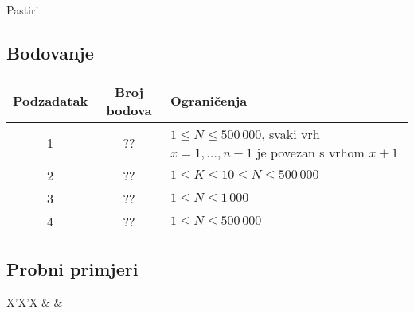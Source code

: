 \begin{statement}[
  problempoints=100,
  timelimit=1 sekunda,
  memorylimit=512 MiB,
]{Pastiri}
\subsection*{Bodovanje}
{\renewcommand{\arraystretch}{1.4}
  \setlength{\tabcolsep}{6pt}
  \begin{tabular}{ccl}
 Podzadatak & Broj bodova & Ograničenja \\ \midrule
  1 & ?? & $1 \le N \le 500\,000$, svaki vrh $x = 1, \dots, n-1$ je povezan s vrhom $x + 1$\\
  2 & ?? & $1 \le K \le 10 \le N \le 500\,000$ \\
  3 & ?? & $1 \le N \le 1\,000$ \\
  4 & ?? & $1 \le N \le 500\,000$ \\
\end{tabular}}

\subsection*{Probni primjeri}
\begin{tabularx}{\textwidth}{X'X'X}
 &
 &
\end{tabularx}

\end{statement}

